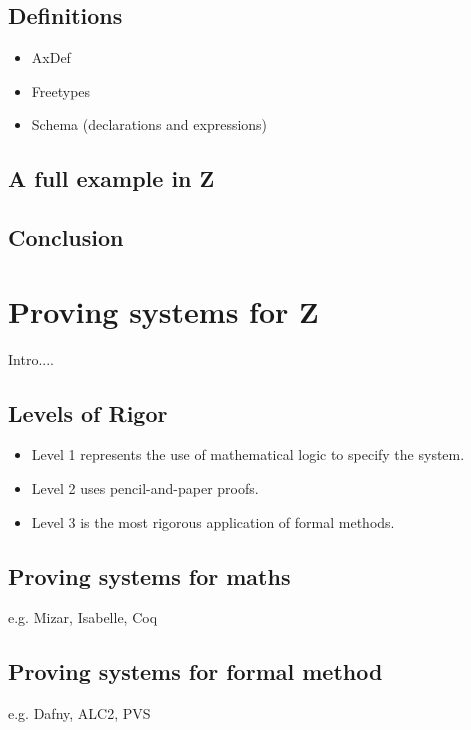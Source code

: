 \subsection{Definitions}

\begin{itemize}
\item AxDef
\item Freetypes
\item Schema (declarations and expressions)
\end{itemize}

\subsection{A full example in Z}


\subsection{Conclusion}

\section{Proving systems for Z}

Intro....

\subsection{Levels of Rigor}

\begin{itemize}
\item Level 1 represents the use of mathematical logic to specify the system.
\item Level 2 uses pencil-and-paper proofs.
\item Level 3 is the most rigorous application of formal methods.

\end{itemize}

\subsection{Proving systems for maths}

e.g. Mizar, Isabelle, Coq

\subsection{Proving systems for formal method}

e.g. Dafny, ALC2, PVS

